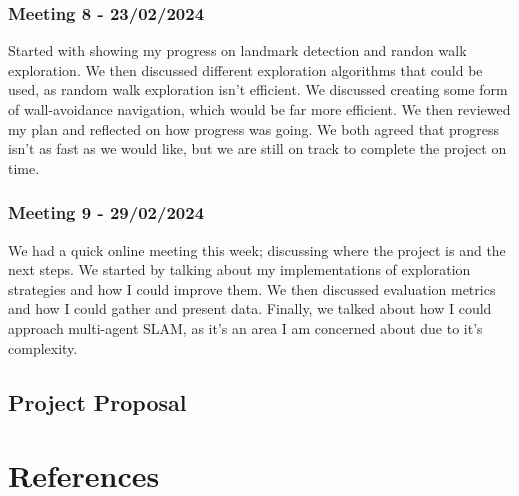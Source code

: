 \documentclass[12pt]{article}
\begin{document}
\subsubsection{Meeting 8 - 23/02/2024}
Started with showing my progress on landmark detection and randon walk exploration. We then discussed different exploration
algorithms that could be used, as random walk exploration isn't efficient. We discussed creating some form of wall-avoidance
navigation, which would be far more efficient. We then reviewed my plan and reflected on how progress was going. We both
agreed that progress isn't as fast as we would like, but we are still on track to complete the project on time.
\subsubsection{Meeting 9 - 29/02/2024}
We had a quick online meeting this week; discussing where the project is and the next steps. We started by talking about
my implementations of exploration strategies and how I could improve them. We then discussed evaluation metrics and how I
could gather and present data. Finally, we talked about how I could approach multi-agent SLAM, as it's an area I am concerned
about due to it's complexity.

\subsection{Project Proposal}


\section{References}
\end{document}
